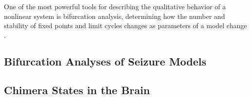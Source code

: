 One of the most powerful tools for describing the qualitative behavior of a nonlinear system is bifurcation analysis, determining how the number and stability of fixed points and limit cycles changes as parameters of a model change \cite{Strogatz2015}.
\subsection{Bifurcation Analyses of Seizure Models}
\label{sec:lit_review_bifurcation}


\subsection{Chimera States in the Brain}
\label{sec:lit_review_chimera}

